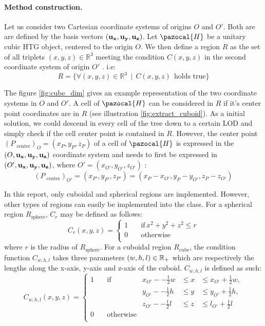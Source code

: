 \documentclass[
	a4paper,
	12pt,
	raggedright,
	twoside
]{tufte-style-article}
\newcommand{\py}[1]{\inlinecode{python}{#1}}
\theoremstyle{definition}
\theoremstyle{remark}
\begin{document}
\paragraph{Method construction.} Let us consider two Cartesian coordinate systems of origins $O$ and $O'$. Both are are defined by the basis vectors $\vb{(u_x, u_y, u_z)}$. Let $\pazocal{H}$ be a unitary cubic \Gls{HTG} object, centered to the origin $O$. We then define a region $R$ as the set of all triplets $(x, y, z) \in \mathbb{R}^3$ meeting the condition $C(x, y, z)$ in the second coordinate system of origin $O'$  . i.e:
\[
R = \{ \forall (x, y, z) \in \mathbb{R}^3 \ \ | \ \ C(x,y,z) \ \ \text{holds true} \}
\]

The figure \ref{fig:cube_dim} gives an example representation of the two coordinate systems in $O$ and $O'$. A cell of $\pazocal{H}$ can be considered in $R$ if it's center point coordinates are in $R$ (see illustration \ref{fig:extract_cuboid}). As a initial solution, we could descend in every cell of the tree down to a certain \Gls{LOD} and simply check if the cell center point is contained in $R$. However, the center point $(P_{\text{ center}})_{O} = (x_P, y_P, z_P)$ of a cell of $\pazocal{H}$ is expressed in the $(O,\vb{u_x, u_y, u_z})$ coordinate system and needs to first be expressed in $(O',\vb{u_x, u_y, u_z})$, where $O' = (x_{O'}, y_{O'}, z_{O'})$ :
\[
    (P_{\text{ center}})_{O'} = (x_{P'}, y_{P'}, z_{P'}) = (x_P- x_{O'}, y_P- y_{O'}, z_P- z_{O'} )
\]

In this report, only cuboidal and spherical regions are implemented. However, other types of regions can easily be implemented into the \py{Region} class. For a spherical region $R_{\text{sphere}}$, $C_r$ may be defined as follows:
\begin{equation}\label{eq:spherical_region}
C_r(x,y,z)=\begin{cases}
          1 \quad &\text{if} \, x^2 + y^2 + z^2 \leq r \\
          0 \quad &\text{otherwise} \\
     \end{cases}
\end{equation}
\noindent
where $r$ is the radius of $R_{\text{sphere}}$. For a cuboidal region $R_{\text{cube}}$, the condition function $C_{w, h, l}$ takes three parameters $(w, h, l)\in\mathbb{R}_+$ which are respectively the lengths along the x-axis, y-axis and z-axis of the cuboid. $C_{w, h, l}$ is defined as such:
\begin{equation}\label{eq:cuboidal_region}
C_{w, h, l}(x,y,z) =  \left\{
    \begin{array}{llccc}
        1 \quad &\text{if} \, & x_{O'} -- \frac{1}{2}w &\leq x &\leq x_{O'} + \frac{1}{2}w, \\
                &             & y_{O'} -- \frac{1}{2}h &\leq y &\leq y_{O'} + \frac{1}{2}h,\\
                &             & z_{O'} -- \frac{1}{2}l &\leq z &\leq l_{O'} + \frac{1}{2}l \\
        0 \quad &\text{otherwise} &\\
    \end{array}
    \right.
\end{equation}
\end{document}
